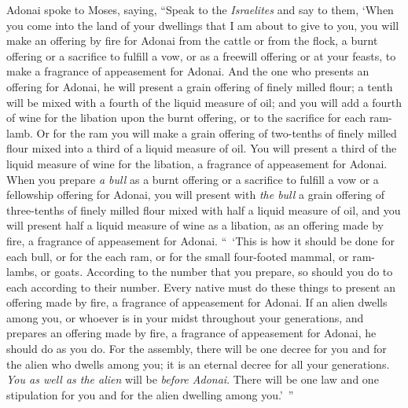 \begin{biblechapter} %
 Adonai spoke to Moses, saying,
\verse “Speak to the \textit{Israelites} and say to them, ‘When you come into the land of your dwellings that I am about to give to you,
\verse you will make an offering by fire for Adonai from the cattle or from the flock, a burnt offering or a sacrifice to fulfill a vow, or as a freewill offering or at your feasts, to make a fragrance of appeasement for Adonai.
\verse And the one who presents an offering for Adonai, he will present a grain offering of finely milled flour; a tenth will be mixed with a fourth of the liquid measure of oil;
\verse and you will add a fourth of wine for the libation upon the burnt offering, or to the sacrifice for each ram-lamb.
\verse Or for the ram you will make a grain offering of two-tenths of finely milled flour mixed into a third of a liquid measure of oil.
\verse You will present a third of the liquid measure of wine for the libation, a fragrance of appeasement for Adonai.
\verse When you prepare \textit{a bull} as a burnt offering or a sacrifice to fulfill a vow or a fellowship offering for Adonai,
\verse you will present with \textit{the bull} a grain offering of three-tenths of finely milled flour mixed with half a liquid measure of oil,
\verse and you will present half a liquid measure of wine as a libation, as an offering made by fire, a fragrance of appeasement for Adonai.
\verse “ ‘This is how it should be done for each bull, or for the each ram, or for the small four-footed mammal, or ram-lambs, or goats.
\verse According to the number that you prepare, so should you do to each according to their number.
\verse Every native must do these things to present an offering made by fire, a fragrance of appeasement for Adonai.
\verse If an alien dwells among you, or whoever is in your midst throughout your generations, and prepares an offering made by fire, a fragrance of appeasement for Adonai, he should do as you do.
\verse For the assembly, there will be one decree for you and for the alien who dwells among you; it is an eternal decree for all your generations. \textit{You as well as the alien} will be \textit{before Adonai}.
\verse There will be one law and one stipulation for you and for the alien dwelling among you.’ ”

\end{biblechapter}
